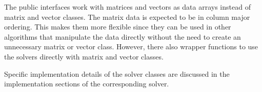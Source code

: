 \documentclass[fontsize = 10pt,DIV = 13]{scrartcl}
\begin{document}
The public interfaces work with matrices and vectors as data arrays instead of matrix and vector classes.
The matrix data is expected to be in column major ordering.
This makes them more flexible since they can be used in other algorithms that manipulate the data directly without the need to create an unnecessary matrix or vector class.
However, there also wrapper functions to use the solvers directly with matrix and vector classes.


Specific implementation  details of the solver classes are discussed in the implementation sections of the corresponding solver.




\begin{comment}


\subsection{Notation}

This document uses bold symbols for matrices and vectors.
Bold capital letters like $\mathbf{A}$ are used for matrices.
Lower case bold letters are used for vectors ($\mathbf{r}$, $\mathbf{x}$).
The individual elements of a vector are given by:

\begin{align*}
\mathbf{x}
=
\begin{bmatrix}
x_0\\
x_1\\
\vdots\\
x_{N-1}
\end{bmatrix}
\end{align*}

Zero based indexing is used since this makes it easier to translate the equations into C++ code.


The individual components of the matrix $\mathbf{A}$ can be distinguished by a single column specific character and a zero based row index.
The column specific characters start with the character $a$ for the first column and increase alphabetically.
For example, the components of $\mathbf{A}$ with size $3 \times 3$ are:

\begin{align*}
\mathbf{A}
=
\begin{bmatrix}
a_0&b_0&c_0\\
a_1&b_1&c_1\\
a_2&b_2&c_2
\end{bmatrix}
\end{align*}

This element naming is chosen because it can be easier translated into vectorized code than the common double index notation.
\end{comment}
\end{document}
